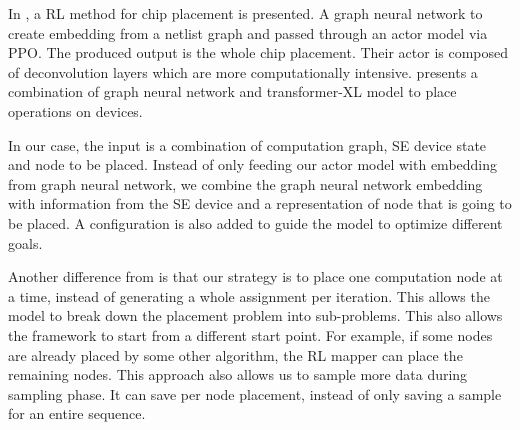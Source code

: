 In \cite{mirhoseini2020chip}, a RL method for chip placement is presented. A graph neural network to create embedding from a netlist graph and passed through an actor model via PPO. 
The produced output is the whole chip placement. Their actor is composed of deconvolution layers which are more computationally intensive. 
\cite{zhou2019gdp} presents a combination of graph neural network and transformer-XL model to place operations on devices. 

In our case, the input is a combination of computation graph, SE device state and node to be placed. 
Instead of only feeding our actor model with embedding from graph neural network, we combine the graph neural network embedding with information from the SE device and a representation of node that is going to be placed. 
A configuration is also added to guide the model to optimize different goals.  

Another difference from \cite{zhou2019gdp}  is that our strategy is to place one computation node at a time, instead of generating a whole assignment per iteration. 
This allows the model to break down the placement problem into sub-problems. 
This also allows the framework to start from a different start point. For example, if some nodes are already placed by some other algorithm, the RL mapper can place the remaining nodes. 
This approach also allows us to sample more data during sampling phase. 
It can save per node placement, instead of only saving a sample for an entire sequence.  